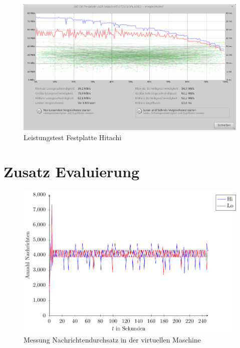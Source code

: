\begin{figure}[htb!]
\centering
\includegraphics[width=1.0\textwidth]{bilder/LaufwerkstestHitachi165GB.png}
\caption{Leistungstest Festplatte Hitachi
\label{fig:festplatteLeistungstest}}
\end{figure}

\section{Zusatz Evaluierung}
\label{section:zusEvaluierung}

\begin{figure}[htb!]
\includegraphics[width=1.0\textwidth]{plots/virtualBoxRaw.pdf}
\caption{Messung Nachrichtendurchsatz in der virtuellen Maschine
\label{fig:messungMaxNachrichten}}
\end{figure}




